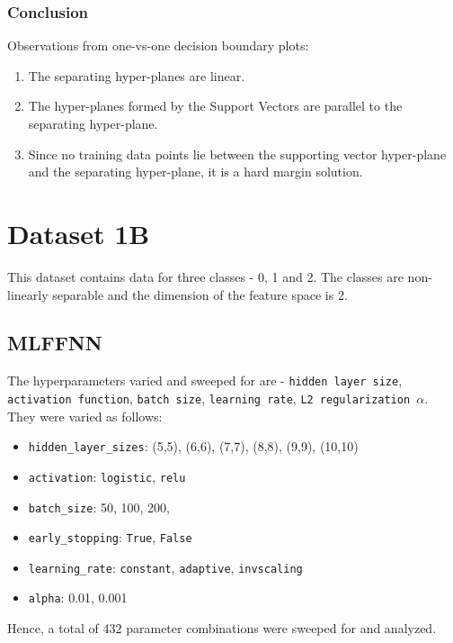 \documentclass[11pt,a4paper]{article}
\newcommand{\noi}{\noindent}
\def\tt#1{\texttt{#1}}
\begin{document}
\subsubsection{Conclusion}
Observations from one-vs-one decision boundary plots:
\begin{enumerate}
    \item The separating hyper-planes are linear.
    \item The hyper-planes formed by the Support Vectors are parallel to the separating hyper-plane. 
    \item Since no training data points lie between the supporting vector hyper-plane and the separating hyper-plane, it is a hard margin solution. 
\end{enumerate}


\break
\section{Dataset 1B}
This dataset contains data for three classes - 0, 1 and 2. The classes are non-linearly separable and the dimension of the feature space is 2.
\subsection{MLFFNN}
The hyperparameters varied and sweeped for are - \tt{hidden layer size}, \tt{activation function}, \tt{batch size}, \tt{learning rate}, \tt{L2 regularization $\alpha$}. They were varied as follows:
\begin{itemize}
    \itemsep0em
    \item \tt{hidden\_layer\_sizes}: (5,5), (6,6), (7,7), (8,8), (9,9), (10,10)
    \item \tt{activation}: \tt{logistic}, \tt{relu}
    \item \tt{batch\_size}: 50, 100, 200, 
    \item \tt{early\_stopping}: \tt{True}, \tt{False}
    \item \tt{learning\_rate}: \tt{constant}, \tt{adaptive}, \tt{invscaling}
    \item \tt{alpha}: 0.01, 0.001
\end{itemize}

\noi
Hence, a total of 432 parameter combinations were sweeped for and analyzed.
\end{document}
